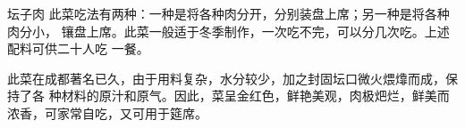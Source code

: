 \begin{recipe}{坛子肉}
\step 此菜吃法有两种：一种是将各种肉分开，分别装盘上席；另一种是将各种肉分小，
镶盘上席。此菜一般适于冬季制作，一次吃不完，可以分几次吃。上述配料可供二十人吃
一餐。

\features

此菜在成都著名已久，由于用料复杂，水分较少，加之封固坛口微火煨㸆而成，保持了各
种材料的原汁和原气。因此，菜呈金红色，鲜艳美观，肉极𤆵\footnotemark 烂，鲜美而
浓香，可家常自吃，又可用于筵席。


\end{recipe}

